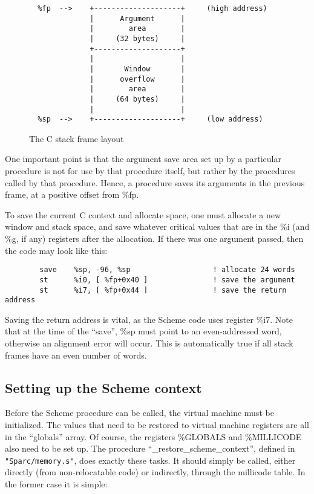 \begin{figure}[hbt]
\begin{verbatim}
  %fp  -->    +--------------------+     (high address)
              |      Argument      |
              |        area        |
              |     (32 bytes)     |
              +--------------------+
              |                    |
              |       Window       |
              |      overflow      |
              |        area        |
              |     (64 bytes)     |
              |                    |
  %sp  -->    +--------------------+     (low address)
\end{verbatim}
\caption{The C stack frame layout}
\label{c-args}
\end{figure}

One important point is that the argument save area set up by a particular
procedure is not for use by that procedure itself, but rather by the
procedures called by that procedure. Hence, a procedure saves its arguments
in the previous frame, at a positive offset from \%fp.

To save the current C context and allocate space, one must allocate a
new window and stack space, and save whatever critical values that are
in the \%i (and \%g, if any) registers after the allocation. If there
was one argument passed, then the code may look like this:

\begin{verbatim}
        save    %sp, -96, %sp                   ! allocate 24 words
        st      %i0, [ %fp+0x40 ]               ! save the argument
        st      %i7, [ %fp+0x44 ]               ! save the return address
\end{verbatim}

Saving the return address is vital, as the Scheme code uses register \%i7.
Note that at the time of the ``save'', \%sp must point to an even-addressed
word, otherwise an alignment error will occur. This is automatically true
if all stack frames have an even number of words.


\subsection{Setting up the Scheme context}

Before the Scheme procedure can be called, the virtual machine must be
initialized. The values that need to be restored to virtual machine
registers are all in the ``globals'' array. Of course, the registers
\%GLOBALS and \%MILLICODE also need to be set up.  The procedure
``\_restore\_scheme\_context'', defined in \verb+"Sparc/memory.s"+,
does exactly these tasks. It should simply be called, either directly
(from non-relocatable code) or indirectly, through the millicode
table. In the former case it is simple:

